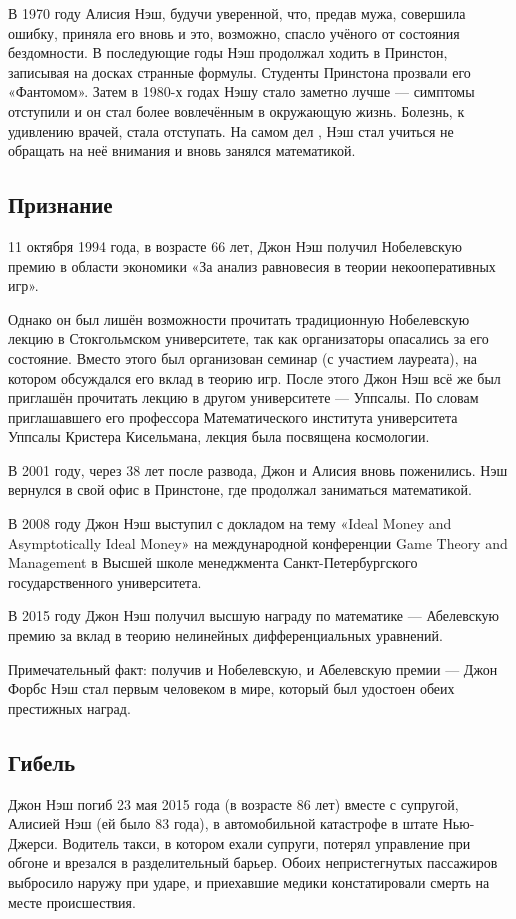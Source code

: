 \documentclass[14pt, a4paper]{extarticle}
\begin{document}
В 1970 году Алисия Нэш, будучи уверенной, что, предав мужа, совершила ошибку,
приняла его вновь и это, возможно, спасло учёного от состояния бездомности. В
последующие годы Нэш продолжал ходить в Принстон, записывая на досках странные
формулы. Студенты Принстона прозвали его «Фантомом». Затем в 1980-х годах
Нэшу стало заметно лучше — симптомы отступили и он стал более вовлечённым в
окружающую жизнь. Болезнь, к удивлению врачей, стала отступать. На самом дел
, Нэш стал учиться не обращать на неё внимания и вновь занялся математикой.

\subsection{Признание}
11 октября 1994 года, в возрасте 66 лет, Джон Нэш получил Нобелевскую премию
в области экономики «За анализ равновесия в теории некооперативных игр».

Однако он был лишён возможности прочитать традиционную Нобелевскую лекцию в
Стокгольмском университете, так как организаторы опасались за его состояние.
Вместо этого был организован семинар (с участием лауреата), на котором
обсуждался его вклад в теорию игр. После этого Джон Нэш всё же был приглашён
прочитать лекцию в другом университете — Уппсалы. По словам приглашавшего
его профессора Математического института университета Уппсалы Кристера
Кисельмана, лекция была посвящена космологии.

В 2001 году, через 38 лет после развода, Джон и Алисия вновь поженились. Нэш
вернулся в свой офис в Принстоне, где продолжал заниматься математикой.

В 2008 году Джон Нэш выступил с докладом на тему «Ideal Money and
Asymptotically Ideal Money» на международной конференции Game Theory and
Management в Высшей школе менеджмента Санкт-Петербургского
государственного университета.

В 2015 году Джон Нэш получил высшую награду по математике — Абелевскую премию
за вклад в теорию нелинейных дифференциальных уравнений.

Примечательный факт: получив и Нобелевскую, и Абелевскую премии — Джон Форбс
Нэш стал первым человеком в мире, который был удостоен обеих престижных наград.

\subsection{Гибель}
Джон Нэш погиб 23 мая 2015 года (в возрасте 86 лет) вместе с супругой,
Алисией Нэш (ей было 83 года), в автомобильной катастрофе в штате Нью-Джерси.
Водитель такси, в котором ехали супруги, потерял управление при обгоне и
врезался в разделительный барьер. Обоих непристегнутых пассажиров выбросило
наружу при ударе, и приехавшие медики констатировали смерть на месте
происшествия.
\end{document}
